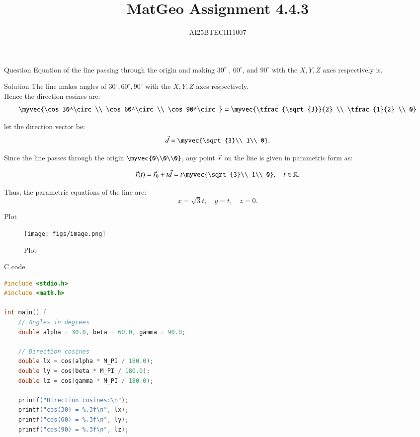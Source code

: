 \documentclass{beamer}
\title 
{MatGeo Assignment 4.4.3}
\author
{AI25BTECH11007}
\begin{document}
\frame{\titlepage}
\begin{frame}{Question}
Equation of the line passing through the origin and making $30^\circ$
, $60^\circ$, and $90^\circ$ with the $X, Y, Z$ axes respectively is.
\end{frame}

\begin{frame}{Solution}
    The line makes angles of $30^\circ, 60^\circ, 90^\circ$ with the $X, Y, Z$ axes respectively. \\

Hence the direction cosines are:
\[
\myvec{\cos 30^\circ \\ \cos 60^\circ \\ \cos 90^\circ}
= \myvec{\tfrac{\sqrt{3}}{2} \\ \tfrac{1}{2} \\ 0}
\]

let the direction vector be:
\[
\vec{d} = 
\myvec{\sqrt{3}\\ 1\\ 0}.
\]

Since the line passes through the origin $\myvec{0\\0\\0}$, any point $\vec{r}$ on the line is given in parametric form as:
\end{frame}

\begin{frame}
\[
\vec{r}(t) = \vec{r}_0 + t\vec{d} 
= t\myvec{\sqrt{3}\\ 1\\ 0}, \quad t \in \mathbb{R}.
\]

Thus, the parametric equations of the line are:
\[
\boxed{
x = \sqrt{3}t, \quad y = t, \quad z = 0.
}
\]
\end{frame}

\begin{frame}{Plot}
    \begin{figure}[H]
    \centering
    \texttt{[image: figs/image.png]}
    \caption{Plot}
    \label{fig:placeholder}
\end{figure}
\end{frame} 

\begin{frame}[fragile]{C code}
\begin{lstlisting}[language = c]
#include <stdio.h>
#include <math.h>

int main() {
    // Angles in degrees
    double alpha = 30.0, beta = 60.0, gamma = 90.0;

    // Direction cosines
    double lx = cos(alpha * M_PI / 180.0);
    double ly = cos(beta * M_PI / 180.0);
    double lz = cos(gamma * M_PI / 180.0);

    printf("Direction cosines:\n");
    printf("cos(30) = %.3f\n", lx);
    printf("cos(60) = %.3f\n", ly);
    printf("cos(90) = %.3f\n", lz);
\end{lstlisting}
\end{frame}
\end{document}
